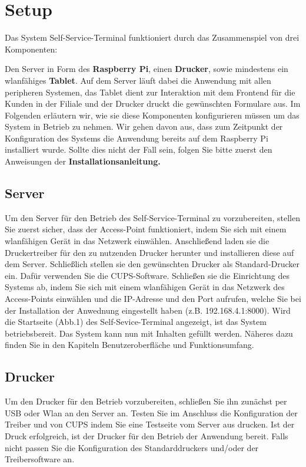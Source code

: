 \section{Setup}
Das System Self-Service-Terminal funktioniert durch das Zusammenspiel von drei Komponenten:\par
\noindent Den Server in Form des \textbf{Raspberry Pi}, einen \textbf{Drucker}, sowie mindestens ein wlanfähiges \textbf{Tablet}. Auf dem Server läuft dabei die Anwendung mit allen peripheren Systemen, das Tablet dient zur Interaktion mit dem Frontend für die Kunden in der Filiale und der Drucker druckt die gewünschten Formulare aus. Im Folgenden erläutern wir, wie sie diese Komponenten konfigurieren müssen um das System in Betrieb zu nehmen. Wir gehen davon aus, dass zum Zeitpunkt der Konfiguration des Systems die Anwendung bereits auf dem Raspberry Pi installiert wurde. Sollte dies nicht der Fall sein, folgen Sie bitte zuerst den Anweisungen der \textbf{Installationsanleitung.}\\

\subsection{Server}

\noindent Um den Server für den Betrieb des Self-Service-Terminal zu vorzubereiten, stellen Sie zuerst sicher, dass der Access-Point funktioniert, indem Sie sich mit einem wlanfähigen Gerät in das Netzwerk einwählen. Anschließend laden sie die Druckertreiber für den zu nutzenden Drucker herunter und installieren diese auf dem Server. Schließlich stellen sie den gewünschten Drucker als Standard-Drucker ein. Dafür verwenden Sie die CUPS-Software. Schließen sie die Einrichtung des Systems ab, indem Sie sich mit einem wlanfähigen Gerät in das Netzwerk des Access-Points einwählen und die IP-Adresse und den Port aufrufen, welche Sie bei der Installation der Anwednung eingestellt haben (z.B. 192.168.4.1:8000). Wird die Startseite (Abb.1) des Self-Sevice-Terminal angezeigt, ist das System betriebsbereit.
Das System kann nun mit Inhalten gefüllt werden. Näheres dazu finden Sie in den Kapiteln \glqq Benutzeroberfläche \grqq{} und \glqq Funktionsumfang\grqq{}.

\newpage

\subsection{Drucker}

\noindent Um den Drucker für den Betrieb vorzubereiten, schließen Sie ihn zunächst per USB oder Wlan an den Server an. Testen Sie im Anschluss die Konfiguration der Treiber und von CUPS indem Sie eine Testseite vom Server aus drucken. Ist der Druck erfolgreich, ist der Drucker für den Betrieb der Anwendung bereit. Falls nicht passen Sie die Konfiguration des Standarddruckers und/oder der Treibersoftware an.\\

